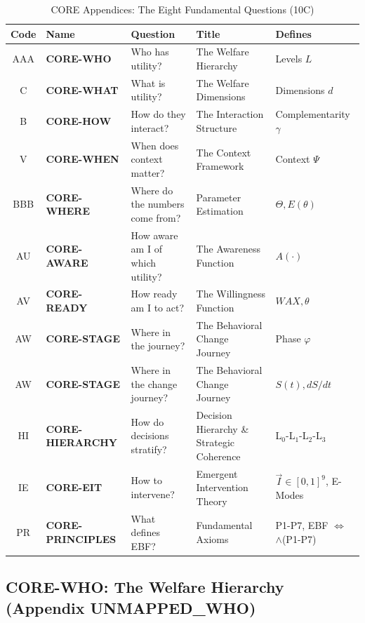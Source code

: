 \begin{table}[htbp]
\centering
\caption{CORE Appendices: The Eight Fundamental Questions (10C)}
\label{tab:index-core}
\renewcommand{\arraystretch}{1.6}
\begin{tabular}{@{}cllll@{}}
\toprule
\textbf{Code} & \textbf{Name} & \textbf{Question} & \textbf{Title} & \textbf{Defines} \\
\midrule
AAA & \textbf{CORE-WHO} & Who has utility? & The Welfare Hierarchy & Levels $L$ \\
C & \textbf{CORE-WHAT} & What is utility? & The Welfare Dimensions & Dimensions $d$ \\
B & \textbf{CORE-HOW} & How do they interact? & The Interaction Structure & Complementarity $\gamma$ \\
V & \textbf{CORE-WHEN} & When does context matter? & The Context Framework & Context $\Psi$ \\
BBB & \textbf{CORE-WHERE} & Where do the numbers come from? & Parameter Estimation & $\Theta, E(\theta)$ \\
AU & \textbf{CORE-AWARE} & How aware am I of which utility? & The Awareness Function & $A(\cdot)$ \\
AV & \textbf{CORE-READY} & How ready am I to act? & The Willingness Function & $WAX, \theta$ \\
AW & \textbf{CORE-STAGE} & Where in the journey? & The Behavioral Change Journey & Phase $\varphi$ \\
AW & \textbf{CORE-STAGE} & Where in the change journey? & The Behavioral Change Journey & $S(t), dS/dt$ \\
HI & \textbf{CORE-HIERARCHY} & How do decisions stratify? & Decision Hierarchy \& Strategic Coherence & L$_0$-L$_1$-L$_2$-L$_3$ \\
IE & \textbf{CORE-EIT} & How to intervene? & Emergent Intervention Theory & $\vec{I} \in [0,1]^9$, E-Modes \\
PR & \textbf{CORE-PRINCIPLES} & What defines EBF? & Fundamental Axioms & P1-P7, EBF $\Leftrightarrow$ $\wedge$(P1-P7) \\
\bottomrule
\end{tabular}
\end{table}

\subsection{CORE-WHO: The Welfare Hierarchy (Appendix UNMAPPED_WHO)}

